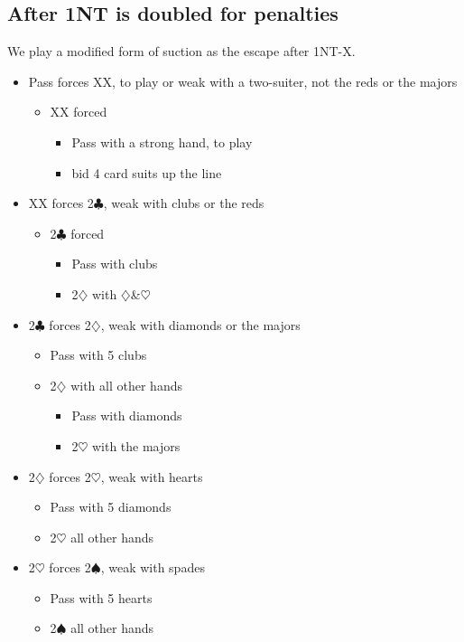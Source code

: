 \documentclass[a4paper,12pt]{article}
\begin{document}
\subsection{After 1NT is doubled for penalties}

We play a modified form of suction as the escape after 1NT-X.

\begin{itemize}
\item Pass forces XX, to play or weak with a two-suiter, not the reds or the majors
	\begin{itemize}
	\item XX forced
		\begin{itemize}
		\item Pass with a strong hand, to play
		\item bid 4 card suits up the line
		\end{itemize}
	\end{itemize}
\item XX forces 2$\clubsuit$, weak with clubs or the reds
	\begin{itemize}
	\item 2$\clubsuit$ forced
		\begin{itemize}
		\item Pass with clubs
		\item 2$\diamondsuit$ with $\diamondsuit$\&$\heartsuit$
		\end{itemize}
	\end{itemize}
\item 2$\clubsuit$ forces 2$\diamondsuit$, weak with diamonds or the majors
	\begin{itemize}
	\item Pass with 5 clubs
	\item 2$\diamondsuit$ with all other hands
		\begin{itemize}
		\item Pass with diamonds
		\item 2$\heartsuit$ with the majors
		\end{itemize}
	\end{itemize}
\item 2$\diamondsuit$ forces 2$\heartsuit$, weak with hearts
	\begin{itemize}
	\item Pass with 5 diamonds
	\item 2$\heartsuit$ all other hands
	\end{itemize}
\item 2$\heartsuit$ forces 2$\spadesuit$, weak with spades
	\begin{itemize}
	\item Pass with 5 hearts
	\item 2$\spadesuit$ all other hands
	\end{itemize}
\end{itemize}
\end{document}
